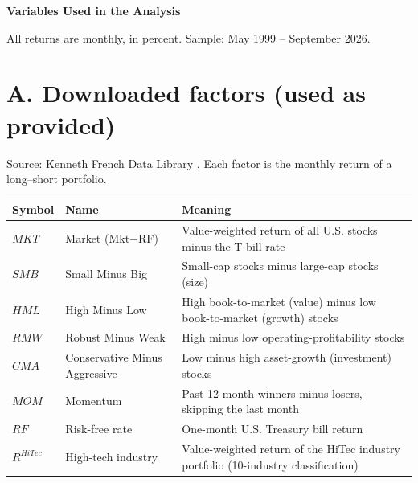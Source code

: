 \documentclass[11pt]{article}
\newcommand{\MKT}{\mathit{MKT}}
\newcommand{\RF}{\mathit{RF}}
\begin{document}
\begin{center}{\large\bfseries Variables Used in the Analysis}\end{center}
All returns are monthly, in percent. Sample: May 1999 -- September 2026.

\section*{A. Downloaded factors (used as provided)}
Source: Kenneth French Data Library \cite{kf}. Each factor is the monthly return of a long--short portfolio.

\begin{center}
\begin{tabular}{@{}lP{3.6cm}P{7.4cm}@{}}
\toprule
Symbol & Name & Meaning \\
\midrule
$\MKT$ & Market (Mkt$-$RF) & Value-weighted return of all U.S. stocks minus the T-bill rate \cite{ff93} \\
$\mathit{SMB}$ & Small Minus Big & Small-cap stocks minus large-cap stocks (size) \cite{ff93,ff15} \\
$\mathit{HML}$ & High Minus Low & High book-to-market (value) minus low book-to-market (growth) stocks \cite{ff93} \\
$\mathit{RMW}$ & Robust Minus Weak & High minus low operating-profitability stocks \cite{ff15} \\
$\mathit{CMA}$ & Conservative Minus Aggressive & Low minus high asset-growth (investment) stocks \cite{ff15} \\
$\mathit{MOM}$ & Momentum & Past 12-month winners minus losers, skipping the last month \cite{c97} \\
$\RF$ & Risk-free rate & One-month U.S. Treasury bill return \\
$R^{\mathit{HiTec}}$ & High-tech industry & Value-weighted return of the HiTec industry portfolio (10-industry classification) \\
\bottomrule
\end{tabular}
\end{center}
\end{document}
